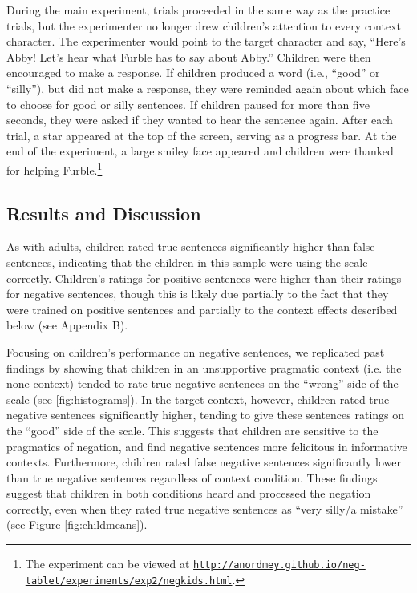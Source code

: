 \documentclass[man, noapacite]{apa2}
\begin{document}
During the main experiment, trials proceeded in the same way as the practice trials, but the experimenter no longer drew children's attention to every context character. The experimenter would point to the target character and say, ``Here's Abby! Let's hear what Furble has to say about Abby.'' Children were then encouraged to make a response. If children produced a word (i.e., ``good'' or ``silly''), but did not make a response, they were reminded again about which face to choose for good or silly sentences. If children paused for more than five seconds, they were asked if they wanted to hear the sentence again. After each trial, a star appeared at the top of the screen, serving as a progress bar. At the end of the experiment, a large smiley face appeared and children were thanked for helping Furble.\footnote{The experiment can be viewed at \href{http://anordmey.github.io/neg-tablet/experiments/exp2/negkids.html}{\nolinkurl{http://anordmey.github.io/neg-tablet/experiments/exp2/negkids.html}}.}

\subsection{Results and Discussion}

As with adults, children rated true sentences significantly higher than false sentences, indicating that the children in this sample were using the scale correctly. Children's ratings for positive sentences were higher than their ratings for negative sentences, though this is likely due partially to the fact that they were trained on positive sentences and partially to the context effects described below (see Appendix B).

Focusing on children's performance on negative sentences, we replicated past findings by showing that children in an unsupportive pragmatic context (i.e. the none context) tended to rate true negative sentences on the ``wrong'' side of the scale (see \ref{fig:histograms}). In the target context, however, children rated true negative sentences significantly higher, tending to give these sentences ratings on the ``good'' side of the scale. This suggests that children are sensitive to the pragmatics of negation, and find negative sentences more felicitous in informative contexts. Furthermore, children rated false negative sentences significantly lower than true negative sentences regardless of context condition. These findings suggest that children in both conditions heard and processed the negation correctly, even when they rated true negative sentences as ``very silly/a mistake'' (see Figure \ref{fig:childmeans}).
\end{document}
